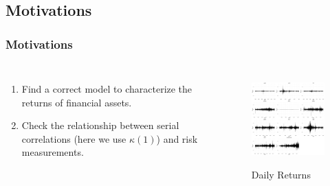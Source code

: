 \documentclass{beamer}
\newcommand\Fontviii{\fontsize{8}{9.2}\selectfont}
\begin{document}
\subsection{Motivations}
\begin{frame}
\frametitle{Motivations}
\Fontviii
\begin{columns}[c]
\begin{enumerate}
\item Find a correct model to characterize the returns of financial assets. 
\item Check the relationship between serial correlations (here we use $\kappa(1)$) and risk measurements.
\end{enumerate}

\begin{figure}[h]
\centering 
\includegraphics[width=6cm]{../figures/summary_daily/returns}
\label{fig: dailyReturns}
\caption{Daily Returns}
\end{figure}

\end{columns}
\end{frame}
\end{document}
